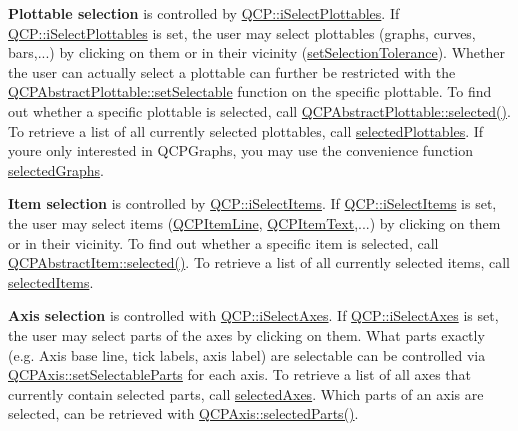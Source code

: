 {\bfseries Plottable selection} is controlled by \hyperlink{namespace_q_c_p_a2ad6bb6281c7c2d593d4277b44c2b037a67148c8227b4155eca49135fc274c7ec}{Q\+C\+P\+::i\+Select\+Plottables}. If \hyperlink{namespace_q_c_p_a2ad6bb6281c7c2d593d4277b44c2b037a67148c8227b4155eca49135fc274c7ec}{Q\+C\+P\+::i\+Select\+Plottables} is set, the user may select plottables (graphs, curves, bars,...) by clicking on them or in their vicinity (\hyperlink{class_q_custom_plot_a4dc31241d7b09680950e19e5f971ed93}{set\+Selection\+Tolerance}). Whether the user can actually select a plottable can further be restricted with the \hyperlink{class_q_c_p_abstract_plottable_a22c69299eb5569e0f6bf084877a37dc4}{Q\+C\+P\+Abstract\+Plottable\+::set\+Selectable} function on the specific plottable. To find out whether a specific plottable is selected, call \hyperlink{class_q_c_p_abstract_plottable_ab901903adcb0e29467d63de72340ab29}{Q\+C\+P\+Abstract\+Plottable\+::selected()}. To retrieve a list of all currently selected plottables, call \hyperlink{class_q_custom_plot_a6721b8c689bb7f2f400987e580508fe8}{selected\+Plottables}. If you\textquotesingle{}re only interested in Q\+C\+P\+Graphs, you may use the convenience function \hyperlink{class_q_custom_plot_ad2a0493bdd01e7aa99a4209ae3a5b67b}{selected\+Graphs}.

{\bfseries Item selection} is controlled by \hyperlink{namespace_q_c_p_a2ad6bb6281c7c2d593d4277b44c2b037aea2f7c105d674e76d9b187b02ef29260}{Q\+C\+P\+::i\+Select\+Items}. If \hyperlink{namespace_q_c_p_a2ad6bb6281c7c2d593d4277b44c2b037aea2f7c105d674e76d9b187b02ef29260}{Q\+C\+P\+::i\+Select\+Items} is set, the user may select items (\hyperlink{class_q_c_p_item_line}{Q\+C\+P\+Item\+Line}, \hyperlink{class_q_c_p_item_text}{Q\+C\+P\+Item\+Text},...) by clicking on them or in their vicinity. To find out whether a specific item is selected, call \hyperlink{class_q_c_p_abstract_item_a225865808640d8d9a7dd19f09a2e93f2}{Q\+C\+P\+Abstract\+Item\+::selected()}. To retrieve a list of all currently selected items, call \hyperlink{class_q_custom_plot_a1a48b13547e2d9ac5cd6927516f47a2e}{selected\+Items}.

{\bfseries Axis selection} is controlled with \hyperlink{namespace_q_c_p_a2ad6bb6281c7c2d593d4277b44c2b037ad6644ac55bef621645326e9dd7469caa}{Q\+C\+P\+::i\+Select\+Axes}. If \hyperlink{namespace_q_c_p_a2ad6bb6281c7c2d593d4277b44c2b037ad6644ac55bef621645326e9dd7469caa}{Q\+C\+P\+::i\+Select\+Axes} is set, the user may select parts of the axes by clicking on them. What parts exactly (e.\+g. Axis base line, tick labels, axis label) are selectable can be controlled via \hyperlink{class_q_c_p_axis_a513f9b9e326c505d9bec54880031b085}{Q\+C\+P\+Axis\+::set\+Selectable\+Parts} for each axis. To retrieve a list of all axes that currently contain selected parts, call \hyperlink{class_q_custom_plot_aa6baf867e8beb96ed5bd471f83ece903}{selected\+Axes}. Which parts of an axis are selected, can be retrieved with \hyperlink{class_q_c_p_axis_a08323248a1cba4750ef07ceea159e0b3}{Q\+C\+P\+Axis\+::selected\+Parts()}.

